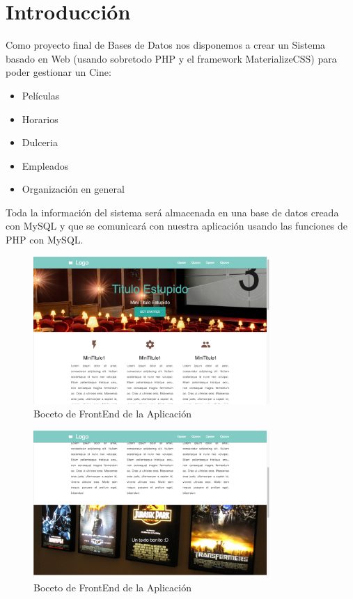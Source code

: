 \documentclass[12pt, fleqn]{article}                             %
\begin{document}
\section{Introducción}




    Como proyecto final de Bases de Datos nos disponemos a crear un Sistema basado en Web 
    (usando sobretodo PHP y el framework MaterializeCSS) para poder gestionar un Cine:
    \begin{itemize}
        \item Películas
        \item Horarios
        \item Dulceria
        \item Empleados
        \item Organización en general
    \end{itemize}


    Toda la información del sistema será almacenada en una base de datos creada con MySQL
    y que se comunicará con nuestra aplicación usando las funciones de PHP con MySQL.

    \clearpage

    \begin{figure}[h!]
        \centering
        \includegraphics[width=0.80\textwidth]{Examples0.png}
        \caption{Boceto de FrontEnd de la Aplicación}
    \end{figure}

    \begin{figure}[h!]
        \centering
        \includegraphics[width=0.80\textwidth]{Examples1.png}
        \caption{Boceto de FrontEnd de la Aplicación}
    \end{figure}
\end{document}
